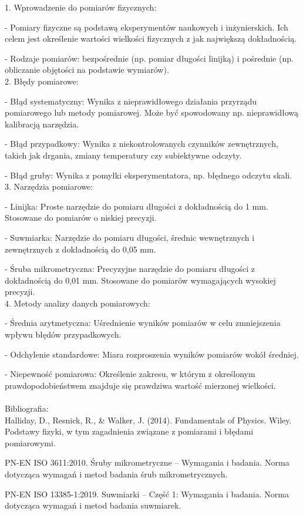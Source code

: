 \documentclass{article}
\begin{document}
\raggedright
    {1. Wprowadzenie do pomiarów fizycznych:

    - Pomiary fizyczne są podstawą eksperymentów naukowych i inżynierskich. Ich celem jest określenie wartości wielkości fizycznych z jak największą dokładnością.

    - Rodzaje pomiarów: bezpośrednie (np. pomiar długości linijką) i pośrednie (np. obliczanie objętości na podstawie wymiarów). \\
    2. Błędy pomiarowe:

    - Błąd systematyczny: Wynika z nieprawidłowego działania przyrządu pomiarowego lub metody pomiarowej. Może być spowodowany np. nieprawidłową kalibracją narzędzia.

    - Błąd przypadkowy: Wynika z niekontrolowanych czynników zewnętrznych, takich jak drgania, zmiany temperatury czy subiektywne odczyty.

    - Błąd gruby: Wynika z pomyłki eksperymentatora, np. błędnego odczytu skali. \\
    3. Narzędzia pomiarowe:

    - Linijka: Proste narzędzie do pomiaru długości z dokładnością do 1 mm. Stosowane do pomiarów o niskiej precyzji.

    - Suwmiarka: Narzędzie do pomiaru długości, średnic wewnętrznych i zewnętrznych z dokładnością do 0,05 mm.

    - Śruba mikrometryczna: Precyzyjne narzędzie do pomiaru długości z dokładnością do 0,01 mm. Stosowane do pomiarów wymagających wysokiej precyzji. \\
    4. Metody analizy danych pomiarowych:

    - Średnia arytmetyczna: Uśrednienie wyników pomiarów w celu zmniejszenia wpływu błędów przypadkowych.

    - Odchylenie standardowe: Miara rozproszenia wyników pomiarów wokół średniej.

    - Niepewność pomiarowa: Określenie zakresu, w którym z określonym prawdopodobieństwem znajduje się prawdziwa wartość mierzonej wielkości. \\
    \textbf{} \\
    Bibliografia: \\
    Halliday, D., Resnick, R., \& Walker, J. (2014). Fundamentals of Physics. Wiley.
    Podstawy fizyki, w tym zagadnienia związane z pomiarami i błędami pomiarowymi.

    PN-EN ISO 3611:2010. Śruby mikrometryczne -- Wymagania i badania.
    Norma dotycząca wymagań i metod badania śrub mikrometrycznych.

    PN-EN ISO 13385-1:2019. Suwmiarki -- Część 1: Wymagania i badania.
    Norma dotycząca wymagań i metod badania suwmiarek.
    }
\end{document}
